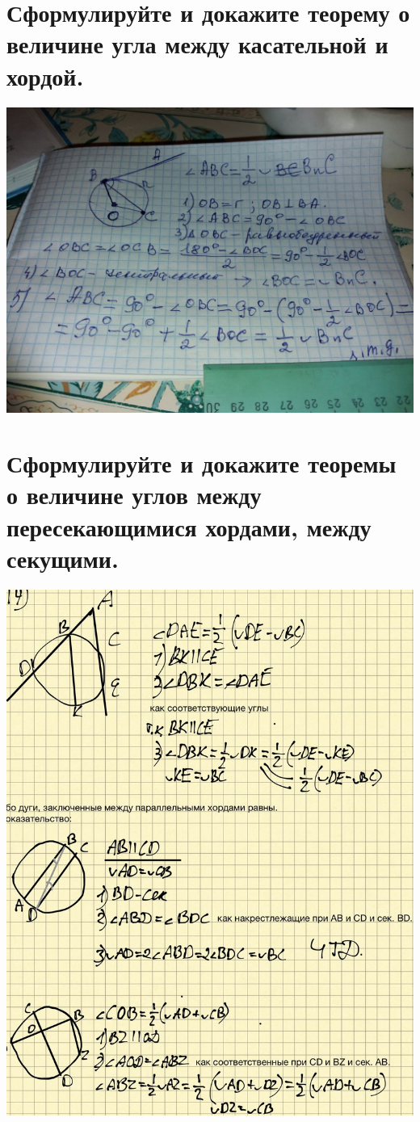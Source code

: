 \documentclass[12pt, letterpaper]{article}
\begin{document}
\section {Сформулируйте и докажите теорему о величине угла между касательной и хордой.}
\includegraphics[scale=0.3]{asset-2.png} \\

\section {Сформулируйте и докажите теоремы о величине углов между пересекающимися хордами, между секущими.}
\includegraphics[scale=0.3]{asset.jpg} \\
\end{document}

